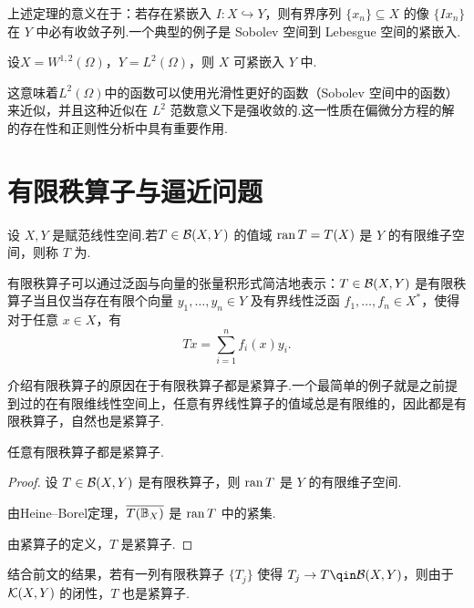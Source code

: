 上述定理的意义在于：若存在紧嵌入 $I:X\hookrightarrow Y$，则有界序列 $\{x_n\}\subseteq X$ 的像 $\{Ix_n\}$ 在 $Y$ 中必有收敛子列.一个典型的例子是 Sobolev 空间到 Lebesgue 空间的紧嵌入.

\begin{instance}
设$X = W^{1,2}(\Omega)$，$Y = L^2(\Omega)$，则 $X$ 可紧嵌入 $Y$ 中.\par
这意味着$L^2(\Omega)$中的函数可以使用光滑性更好的函数（Sobolev 空间中的函数）来近似，并且这种近似在 $L^2$ 范数意义下是强收敛的.这一性质在偏微分方程的解的存在性和正则性分析中具有重要作用.
\end{instance}

\section{有限秩算子与逼近问题}

\begin{definition}[有限秩算子]
设 $X,Y$ 是赋范线性空间.若$T\in\mathcal{B}(X,Y)$ 的值域 $\operatorname{ran} T = T(X)$ 是 $Y$ 的有限维子空间，则称 $T$ 为.
\end{definition}

\begin{note}
有限秩算子可以通过泛函与向量的张量积形式简洁地表示：$T\in\mathcal{B}(X,Y)$ 是有限秩算子当且仅当存在有限个向量 $y_1, \dots, y_n \in Y$ 及有界线性泛函 $f_1, \dots, f_n \in X^*$，使得对于任意 $x \in X$，有
\begin{equation*}
Tx = \sum_{i=1}^n f_i(x)y_i.
\end{equation*}
\end{note}
介绍有限秩算子的原因在于有限秩算子都是紧算子.一个最简单的例子就是之前提到过的在有限维线性空间上，任意有界线性算子的值域总是有限维的，因此都是有限秩算子，自然也是紧算子.
\begin{proposition}
    任意有限秩算子都是紧算子.
\end{proposition}
\begin{proof}
设 $T\in\mathcal{B}(X,Y)$ 是有限秩算子，则 $\operatorname{ran} T$ 是 $Y$ 的有限维子空间.\par
由Heine--Borel定理，$\overline{T(\mathbb{B}_X)}$ 是 $\operatorname{ran} T$ 中的紧集.\par
由紧算子的定义，$T$ 是紧算子.
\end{proof}

结合前文的结果，若有一列有限秩算子 $\{T_j\}$ 使得 $T_j\to T\qin \mcal{B}(X,Y)$，则由于 $\mathcal{K}(X,Y)$ 的闭性，$T$ 也是紧算子.

